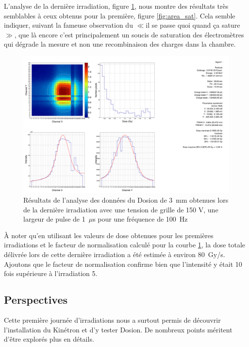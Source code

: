 \documentclass[a4paper,11pt]{article}
\begin{document}
L'analyse de la dernière irradiation, figure \ref{fig:area_pm}, nous montre des résultats très semblables à ceux obtenus pour la première, figure \ref{fig:area_sat}.
Cela semble indiquer, suivant la fameuse observation du $\ll$il se passe quoi quand ça sature$\gg$, que là encore c'est principalement un soucis de saturation des électromètres qui dégrade la mesure et non une recombinaison des charges dans la chambre.
\begin{figure}[h]
\begin{center}
\includegraphics[width=\linewidth]{Area_1_PM_6.png} 
\caption{\label{fig:area_pm}\footnotesize{Résultats de l'analyse des données du Dosion de 3~mm obtenues lors de la dernière irradiation avec une tension de grille de 150 V, une largeur de pulse de 1~$\mu$s pour une fréquence de 100~Hz}}
\end{center}
\end{figure}
\`A noter qu'en utilisant les valeurs de dose obtenues pour les premières irradiations et le facteur de normalisation calculé pour la courbe \ref{fig:area_pm}, la dose totale délivrée lors de cette dernière irradiation a été estimée à environ 80~Gy/s.
Ajoutons que le facteur de normalisation confirme bien que l'intensité y était 10 fois supérieure à l'irradiation 5.

\clearpage
\subsection*{Perspectives}

Cette première journée d'irradiations nous a surtout permis de découvrir l'installation du Kinétron et d'y tester Dosion.
De nombreux points méritent d'être explorés plus en détails.
\end{document}
